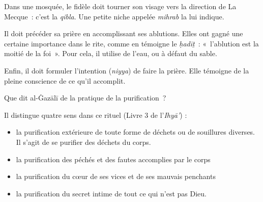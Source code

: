 Dans une mosquée, le fidèle doit tourner son visage vers la direction de
La Mecque~: c'est la \emph{qibla}. Une petite niche appelée
\emph{mihrab} la lui indique.




Il doit précéder sa prière en accomplissant ses ablutions. Elles ont
gagné une certaine importance dans le rite, comme en témoigne le
\emph{ḥadīṯ}~: «~l'ablution est la moitié de la foi~». Pour cela, il utilise de l'eau, ou à défaut
du sable.

Enfin, il doit formuler l'intention (\emph{niyya}) de faire la prière.
Elle témoigne de la pleine conscience de ce qu'il accomplit.

Que dit al-Ġazālī \label{theol:AlGazali11} de la pratique de la purification~?

Il distingue quatre sens dans ce rituel (Livre 3 de l'\emph{Ihyā'}) :

\begin{itemize}
\item
  la purification extérieure de toute forme de déchets ou de souillures
  diverses. Il s'agit de se purifier des déchets du corps.
\item
  la purification des péchés et des fautes accomplies par le corps
\item
  la purification du cœur de ses vices et de ses mauvais penchants
\item
  la purification du secret intime de tout ce qui n'est pas Dieu.
\end{itemize}

